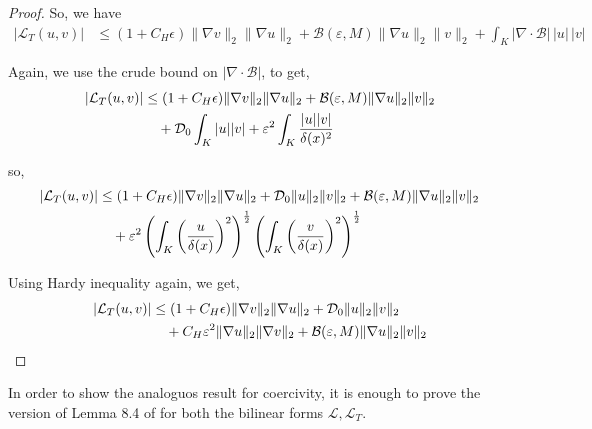 \documentclass{article}
\theoremstyle{plain}
\theoremstyle{definition}
\theoremstyle{plain}
\newcommand{\eps}{\epsilon}
\begin{document}
\begin{proof}
So, we have
\begin{align}
|\mathcal{L}_T(u,v)| &\leq (1+C_H \eps)\|\nabla v\|_2 \|\nabla u\|_2
+ \mathcal{B}(\varepsilon,M)\|\nabla u\|_2 \|v\|_2
+ \int_K |\nabla \cdot \mathcal{B}|\, |u|\, |v|
\end{align}

Again, we use the crude bound on $|\nabla \cdot \mathcal{B}|$, to get,
\begin{align}
|\mathcal{L}_T(u,v)| &\leq (1+C_H \eps)\|\nabla v\|_2 \|\nabla u\|_2
+ \mathcal{B}(\varepsilon,M)\|\nabla u\|_2 \|v\|_2 \notag \\
&\quad + \mathcal{D}_0 \int_K |u||v|
+ \varepsilon^2 \int_K \frac{|u||v|}{\delta(x)^2}
\end{align}

so,
\begin{align}
|\mathcal{L}_T(u,v)| &\leq (1+C_H \eps)\|\nabla v\|_2 \|\nabla u\|_2
+ \mathcal{D}_0 \|u\|_2 \|v\|_2 \notag +\mathcal{B}(\varepsilon,M)\|\nabla u\|_2 \|v\|_2 \\
&\quad + \varepsilon^2
\left(\int_K \left(\frac{u}{\delta(x)}\right)^2\right)^{\frac{1}{2}}
\left(\int_K \left(\frac{v}{\delta(x)}\right)^2\right)^{\frac{1}{2}}
\end{align}

Using Hardy inequality again, we get,
\begin{align}
|\mathcal{L}_T(u,v)| &\leq (1+C_H \eps) \|\nabla v\|_2 \|\nabla u\|_2
+ \mathcal{D}_0 \|u\|_2 \|v\|_2 \notag \\
&\quad + C_H \varepsilon^2 \|\nabla u\|_2 \|\nabla v\|_2
+ \mathcal{B}(\varepsilon,M)\|\nabla u\|_2 \|v\|_2
\end{align}
\end{proof}


In order to show the analoguos result for coercivity, it is enough to prove the version of Lemma 8.4 of \cite{Gt} for both the bilinear forms $\mathcal{L}, \mathcal{L}_T$.
\end{document}
